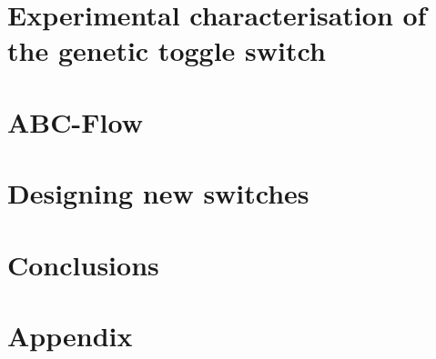 \documentclass[]{phdthesis}
\begin{document}
\mainmatter*
\chapter{Experimental characterisation of the genetic toggle switch}



\mainmatter*
\chapter{ABC-Flow}


\mainmatter*
\chapter{Designing new switches}


\mainmatter*
\chapter{Conclusions}


\printbibliography

\appendix*
\chapter{Appendix}

\end{document}
